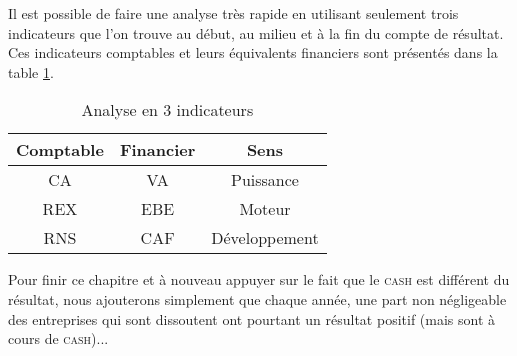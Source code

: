 Il est possible de faire une analyse très rapide en utilisant seulement trois indicateurs 
que l'on trouve au début, au milieu et à la fin du compte de résultat. Ces indicateurs 
comptables et leurs équivalents financiers sont présentés dans la table \ref{table:3indicateurs}.

\begin{table}[h]
\renewcommand{\arraystretch}{1.2}
\footnotesize
\centering
\begin{tabular}{|c|c|c|}
\hline
  Comptable & Financier & Sens \\                                                                      
\hline                                                                                                      
  CA & VA & Puissance \\                                                                    
\hline                                                                                                      
  REX & EBE & Moteur \\                                                                              
\hline                                                                                                          
  RNS & CAF & Développement \\                                                                                         
\hline                                                                                                      
\end{tabular}                                                                                                                                                                                                       
\caption{Analyse en 3 indicateurs}       
\label{table:3indicateurs}                                                    
\end{table}

Pour finir ce chapitre et à nouveau appuyer sur le fait que le \textsc{cash} est différent 
du résultat, nous ajouterons simplement que chaque année, une part non négligeable des entreprises 
qui sont dissoutent ont pourtant un résultat positif (mais sont à cours de \textsc{cash})...
